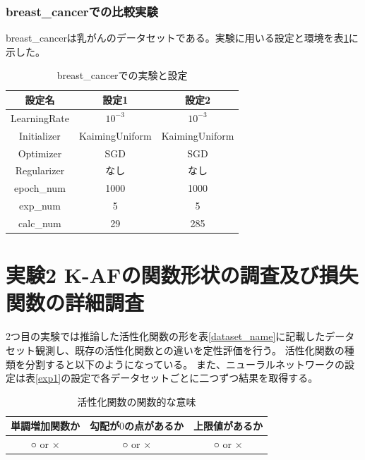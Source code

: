 \subsubsection{breast\_cancerでの比較実験}
\label{impl:breastcancer}

breast\_cancerは乳がんのデータセットである。実験に用いる設定と環境を表\ref{exp:breastcancer}に示した。

\begin{table}[htbp]
    \begin{center}
        \caption{breast\_cancerでの実験と設定}
        \label{exp:breastcancer}
        \vspace{2mm} 
        \begin{tabular}{ |c|c|c| }
        \hline
        設定名 & 設定1 & 設定2 \\
        \hline
        LearningRate         & $ 10^{-3} $ & $ 10^{-3} $ \\
        \hline
        Initializer       & KaimingUniform & KaimingUniform \\
        \hline
        Optimizer           & SGD & SGD \\
        \hline
        Regularizer     & なし & なし \\
        \hline
        epoch\_num       & 1000 &  1000 \\
        \hline
        exp\_num         & 5 & 5 \\
        \hline
        calc\_num        & 29 & 285 \\
        \hline
        \end{tabular}
    \end{center}
\end{table}


\vspace{-5mm} 

\section{実験2 K-AFの関数形状の調査及び損失関数の詳細調査}
\label{exp2}

2つ目の実験では推論した活性化関数の形を表\ref{dataset_name}に記載したデータセット観測し、既存の活性化関数との違いを定性評価を行う。
活性化関数の種類を分割すると以下のようになっている。
また、ニューラルネットワークの設定は表\ref{exp1}の設定で各データセットごとに二つずつ結果を取得する。

\begin{table}[htbp]
    \begin{center}
        \caption{活性化関数の関数的な意味}
        \label{af-class}
        \vspace{2mm} 
        \begin{tabular}{ |c|c|c| }
        \hline
        単調増加関数か & 勾配が$ 0 $の点があるか & 上限値があるか   \\
        \hline
        ○ or × & ○ or × & ○ or ×  \\
        \hline
        \end{tabular}
    \end{center}
\end{table}


